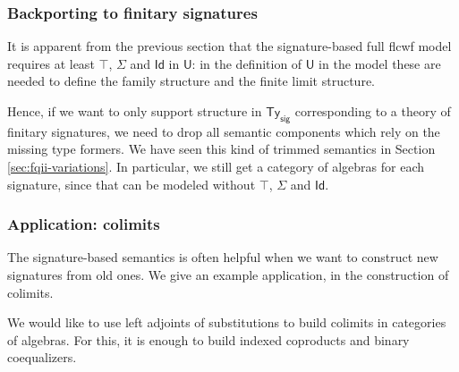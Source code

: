 \documentclass[12pt,a4paper,twoside,openany]{book}
\theoremstyle{remark}
\theoremstyle{definition}
\theoremstyle{theorem}
\newcommand{\ms}[1]{\mathsf{#1}}
\newcommand{\bs}[1]{\boldsymbol{#1}}
\newcommand{\Tys}{\ms{Ty_{sig}}}
\newcommand{\U}{\mathsf{U}}
\newcommand{\Id}{\mathsf{Id}}
\newcommand{\bU}{\bs{\U}}
\begin{document}
\subsubsection{Backporting to finitary signatures}

It is apparent from the previous section that the signature-based full flcwf
model requires at least $\top$, $\Sigma$ and $\Id$ in $\U$: in the definition of
$\bU$ in the model these are needed to define the family structure and the
finite limit structure.

Hence, if we want to only support structure in $\Tys$ corresponding to a theory
of finitary signatures, we need to drop all semantic components which rely on
the missing type formers. We have seen this kind of trimmed semantics in Section
\ref{sec:fqii-variations}. In particular, we still get a category of algebras
for each signature, since that can be modeled without $\top$, $\Sigma$ and
$\Id$.

\subsubsection{Application: colimits}

The signature-based semantics is often helpful when we want to construct new
signatures from old ones. We give an example application, in the construction of
colimits.

We would like to use left adjoints of substitutions to build colimits in
categories of algebras. For this, it is enough to build indexed coproducts and
binary coequalizers.
\end{document}
